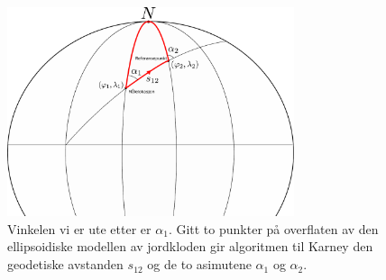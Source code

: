 \begin{figure}
    \centering
    \includegraphics[width=0.75\textwidth]{img/ellipsoidal_problem.pdf}
    \caption{Vinkelen vi er ute etter er $\alpha_1$. Gitt to punkter på overflaten av den ellipsoidiske modellen av jordkloden gir algoritmen til Karney den geodetiske avstanden $s_{12}$ og de to asimutene $\alpha_1$ og $\alpha_2$.}
    \label{fig:inverse_problem}
\end{figure}
